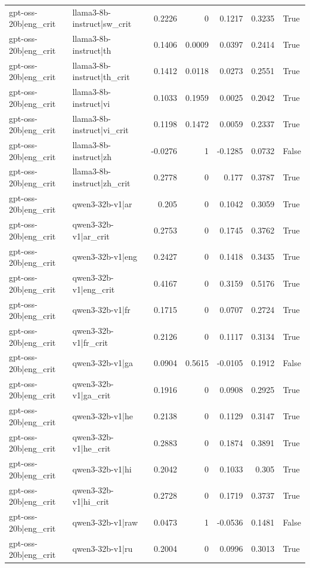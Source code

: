 \begin{table}
\begin{tabular}{l l r r r r l}
gpt-oss-20b|eng_crit & llama3-8b-instruct|sw_crit & 0.2226 & 0 & 0.1217 & 0.3235 & True \\
gpt-oss-20b|eng_crit & llama3-8b-instruct|th & 0.1406 & 0.0009 & 0.0397 & 0.2414 & True \\
gpt-oss-20b|eng_crit & llama3-8b-instruct|th_crit & 0.1412 & 0.0118 & 0.0273 & 0.2551 & True \\
gpt-oss-20b|eng_crit & llama3-8b-instruct|vi & 0.1033 & 0.1959 & 0.0025 & 0.2042 & True \\
gpt-oss-20b|eng_crit & llama3-8b-instruct|vi_crit & 0.1198 & 0.1472 & 0.0059 & 0.2337 & True \\
gpt-oss-20b|eng_crit & llama3-8b-instruct|zh & -0.0276 & 1 & -0.1285 & 0.0732 & False \\
gpt-oss-20b|eng_crit & llama3-8b-instruct|zh_crit & 0.2778 & 0 & 0.177 & 0.3787 & True \\
gpt-oss-20b|eng_crit & qwen3-32b-v1|ar & 0.205 & 0 & 0.1042 & 0.3059 & True \\
gpt-oss-20b|eng_crit & qwen3-32b-v1|ar_crit & 0.2753 & 0 & 0.1745 & 0.3762 & True \\
gpt-oss-20b|eng_crit & qwen3-32b-v1|eng & 0.2427 & 0 & 0.1418 & 0.3435 & True \\
gpt-oss-20b|eng_crit & qwen3-32b-v1|eng_crit & 0.4167 & 0 & 0.3159 & 0.5176 & True \\
gpt-oss-20b|eng_crit & qwen3-32b-v1|fr & 0.1715 & 0 & 0.0707 & 0.2724 & True \\
gpt-oss-20b|eng_crit & qwen3-32b-v1|fr_crit & 0.2126 & 0 & 0.1117 & 0.3134 & True \\
gpt-oss-20b|eng_crit & qwen3-32b-v1|ga & 0.0904 & 0.5615 & -0.0105 & 0.1912 & False \\
gpt-oss-20b|eng_crit & qwen3-32b-v1|ga_crit & 0.1916 & 0 & 0.0908 & 0.2925 & True \\
gpt-oss-20b|eng_crit & qwen3-32b-v1|he & 0.2138 & 0 & 0.1129 & 0.3147 & True \\
gpt-oss-20b|eng_crit & qwen3-32b-v1|he_crit & 0.2883 & 0 & 0.1874 & 0.3891 & True \\
gpt-oss-20b|eng_crit & qwen3-32b-v1|hi & 0.2042 & 0 & 0.1033 & 0.305 & True \\
gpt-oss-20b|eng_crit & qwen3-32b-v1|hi_crit & 0.2728 & 0 & 0.1719 & 0.3737 & True \\
gpt-oss-20b|eng_crit & qwen3-32b-v1|raw & 0.0473 & 1 & -0.0536 & 0.1481 & False \\
gpt-oss-20b|eng_crit & qwen3-32b-v1|ru & 0.2004 & 0 & 0.0996 & 0.3013 & True \\

\end{tabular}
\end{table}
